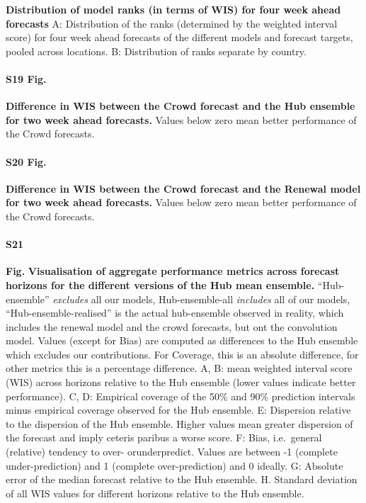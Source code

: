 \documentclass[10pt,letterpaper]{article}
\begin{document}
\textbf{Distribution of model ranks (in terms of WIS) for four week ahead forecasts}
A: Distribution of the ranks (determined by the weighted interval score)
for four week ahead forecasts of the different models and forecast
targets, pooled across locations. B: Distribution of ranks separate by
country.

\paragraph{S19 Fig.}
\label{fig:distribution-scores-differences}

\textbf{Difference in WIS between the Crowd forecast and the Hub ensemble for two week ahead forecasts.}
Values below zero mean better performance of the Crowd forecasts.

\paragraph{S20 Fig.}
\label{fig:distribution-scores-differences-renewal}

\textbf{Difference in WIS between the Crowd forecast and the Renewal model for two week ahead forecasts.}
Values below zero mean better performance of the Crowd forecasts.

\paragraph{S21}

\textbf{Fig.} \label{fig:agg-performance-ensemble-mean}
\textbf{Visualisation of aggregate performance metrics across forecast horizons for the different versions of the Hub mean ensemble.}
``Hub-ensemble'' \textit{excludes} all our models, Hub-ensemble-all
\textit{includes} all of our models, ``Hub-ensemble-realised'' is the
actual hub-ensemble observed in reality, which includes the renewal
model and the crowd forecasts, but ont the convolution model. Values
(except for Bias) are computed as differences to the Hub ensemble which
excludes our contributions. For Coverage, this is an absolute
difference, for other metrics this is a percentage difference. A, B:
mean weighted interval score (WIS) across horizons relative to the Hub
ensemble (lower values indicate better performance). C, D: Empirical
coverage of the 50\% and 90\% prediction intervals minus empirical
coverage observed for the Hub ensemble. E: Dispersion relative to the
dispersion of the Hub ensemble. Higher values mean greater dispersion of
the forecast and imply ceteris paribus a worse score. F: Bias,
i.e.~general (relative) tendency to over- orunderpredict. Values are
between -1 (complete under-prediction) and 1 (complete over-prediction)
and 0 ideally. G: Absolute error of the median forecast relative to the
Hub ensemble. H. Standard deviation of all WIS values for different
horizons relative to the Hub ensemble.
\end{document}
